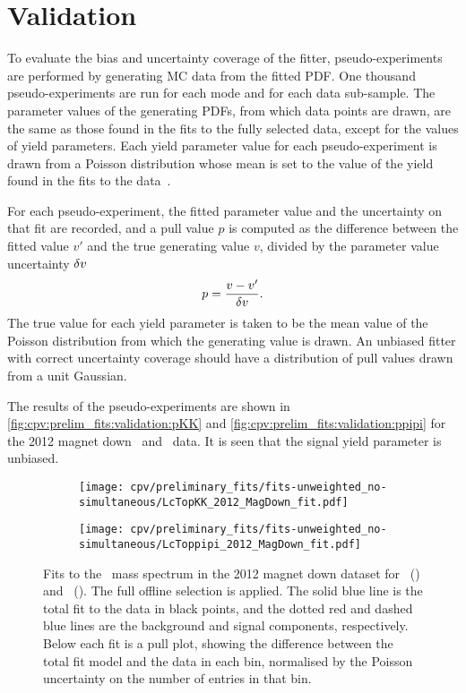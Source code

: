 \section{Validation}
\label{chap:cpv:prelim_fits:validation}

To evaluate the bias and uncertainty coverage of the fitter, pseudo-experiments 
are performed by generating \ac{MC} data from the fitted \ac{PDF}.
One thousand pseudo-experiments are run for each mode and for each data 
sub-sample.
The parameter values of the generating \acp{PDF}, from which data points are 
drawn, are the same as those found in the fits to the fully selected data, 
except for the values of yield parameters.
Each yield parameter value for each pseudo-experiment is drawn from a Poisson 
distribution whose mean is set to the value of the yield found in the fits to 
the data~\cite{Karbach:2012vg}.

For each pseudo-experiment, the fitted parameter value and the uncertainty on 
that fit are recorded, and a pull value $p$ is computed as the difference 
between the fitted value $v'$ and the true generating value $v$, divided by the 
parameter value uncertainty $\delta{v}$
\begin{equation}
  p = \frac{v - v'}{\delta{v}}.
\end{equation}
The true value for each yield parameter is taken to be the mean value of the 
Poisson distribution from which the generating value is drawn.
An unbiased fitter with correct uncertainty coverage should have a distribution 
of pull values drawn from a unit Gaussian.

The results of the pseudo-experiments are shown in 
\cref{fig:cpv:prelim_fits:validation:pKK} and 
\cref{fig:cpv:prelim_fits:validation:ppipi} for the 2012 magnet down \pKK\ and 
\ppipi\ data.
It is seen that the signal yield parameter is unbiased.

\begin{figure}
  \begin{subfigure}[b]{0.5\textwidth}
    \texttt{[image: cpv/preliminary\_fits/fits-unweighted\_no-simultaneous/LcTopKK\_2012\_MagDown\_fit.pdf]}
    \caption{\pKK}
    \label{fig:cpv:prelim_fits:full:pKK}
  \end{subfigure}
  \begin{subfigure}[b]{0.5\textwidth}
    \texttt{[image: cpv/preliminary\_fits/fits-unweighted\_no-simultaneous/LcToppipi\_2012\_MagDown\_fit.pdf]}
    \caption{\ppipi}
    \label{fig:cpv:prelim_fits:full:ppipi}
  \end{subfigure}
  \caption{%
    Fits to the \PLambdac\ mass spectrum in the 2012 magnet down dataset for 
    \pKK~() and 
    \ppipi~().
    The full offline selection is applied.
    The solid blue line is the total fit to the data in black points, and the 
    dotted red and dashed blue lines are the background and signal components, 
    respectively.
    Below each fit is a pull plot, showing the difference between the total fit 
    model and the data in each bin, normalised by the Poisson uncertainty on 
    the number of entries in that bin.
  }
  \label{fig:cpv:prelim_fits:full}
\end{figure}

